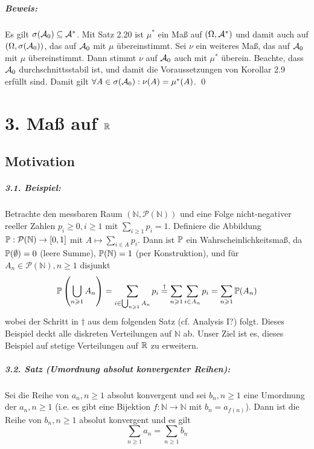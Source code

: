\documentclass[12pt]{report}
\begin{document}
\paragraph{Beweis:}Es gilt $\sigma(\mathcal{A}_0)\subseteq\mathcal{A}^*$. Mit Satz 2.20 ist $\mu^*$ ein Ma\ss{} auf $(\Omega,\mathcal{A}^*)$ und damit auch auf $(\Omega,\sigma(\mathcal{A}_0))$, das auf $\mathcal{A}_0$ mit $\mu$ \"ubereinstimmt. Sei $\nu$ ein weiteres Ma\ss{}, das auf $\mathcal{A}_0$ mit $\mu$ \"ubereinstimmt. Dann stimmt $\nu$ auf $\mathcal{A}_0$ auch mit $\mu^*$ \"uberein. Beachte, dass $\mathcal{A}_0$ durchschnittsstabil ist, und damit die Voraussetzungen von Korollar 2.9 erf\"ullt sind. Damit gilt $\forall A\in\sigma(\mathcal{A}_0):\nu(A)=\mu^*(A)$. \qed

\chapter*{3. Ma\ss{} auf $\mathbb{R}$}

\section*{Motivation}

\paragraph{3.1. Beispiel:}Betrachte den messbaren Raum $(\mathbb{N},\mathcal{P}(\mathbb{N}))$ und eine Folge nicht-negativer reeller Zahlen $p_i\geq0,i\geq1$ mit $\sum_{i\geq1}p_i=1$. Definiere die Abbildung $\mathbb{P}:\mathcal{P}(\mathbb{N})\to[0,1]$ mit $A\mapsto\sum_{i\in A}p_i$. Dann ist $\mathbb{P}$ ein Wahrscheinlichkeitsma\ss{}, da $\mathbb{P}(\emptyset)=0$ (leere Summe), $\mathbb{P}(\mathbb{N})=1$ (per Konstruktion), und f\"ur $A_n\in\mathcal{P}(\mathbb{N}), n\geq1$ disjunkt
$$\mathbb{P}\left(\bigcup_{n\geqslant1}A_n\right)=\sum_{i\in\bigcup_{n\geqslant1}A_n}p_i\overset{\dagger}{=}\sum_{n\geqslant1}\sum_{i\in A_n}p_i=\sum_{n\geqslant1}\mathbb{P}(A_n)$$
wobei der Schritt in $\dagger$ aus dem folgenden Satz (cf. Analysis I?) folgt. Dieses Beispiel deckt alle diskreten Verteilungen auf $\mathbb{N}$ ab. Unser Ziel ist es, dieses Beispiel auf stetige Verteilungen auf $\mathbb{R}$ zu erweitern.

\paragraph{3.2. Satz (Umordnung absolut konvergenter Reihen):}Sei die Reihe von $a_n,n\geq1$ absolut konvergent und sei $b_n,n\geq1$ eine Umordnung der $a_n,n\geq1$ (i.e. es gibt eine Bijektion $f:\mathbb{N}\to\mathbb{N}$ mit $b_n=a_{f(n)}$). Dann ist die Reihe von $b_n,n\geq1$ absolut konvergent und es gilt
$$\sum_{n\geq1}a_n=\sum_{n\geq1}b_n$$
\end{document}

